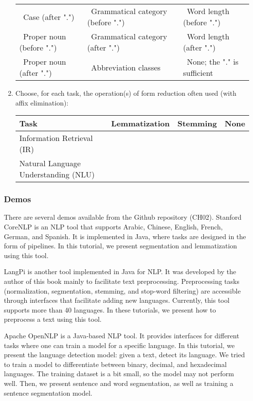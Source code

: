 \documentclass{KBook}
\begin{document}
\begin{enumerate}
	\begin{tabular}{|lll|}
		\hline 
		\Square\ Case (after ".") & \Square\ Grammatical category (before ".") & \Square\ Word length (before ".")\\
		\Square\ Proper noun (before ".") & \Square\ Grammatical category (after ".") & \Square\ Word length (after ".")\\
		\Square\ Proper noun (after ".") & \Square\ Abbreviation classes & \Square\ None; the "." is sufficient\\
		\hline
	\end{tabular}
	
	\item Choose, for each task, the operation(s) of form reduction often used (with affix elimination):
	
	\begin{tabular}{|llll|}
		\hline 
		Task & Lemmatization & Stemming & None\\
		\hline
		Information Retrieval (IR) & \CheckedBox & \Square & \Square \\
		Natural Language Understanding (NLU) & \Square & \CheckedBox & \Square \\
		\hline
	\end{tabular}
	
\end{enumerate}



\subsubsection*{Demos}

There are several demos available from the Github repository (CH02).
Stanford CoreNLP is an NLP tool that supports Arabic, Chinese, English, French, German, and Spanish.
It is implemented in Java, where tasks are designed in the form of pipelines.
In this tutorial, we present segmentation and lemmatization using this tool.

LangPi is another tool implemented in Java for NLP.
It was developed by the author of this book mainly to facilitate text preprocessing.
Preprocessing tasks (normalization, segmentation, stemming, and stop-word filtering) are accessible through interfaces that facilitate adding new languages.
Currently, this tool supports more than 40 languages.
In these tutorials, we present how to preprocess a text using this tool.

Apache OpenNLP is a Java-based NLP tool.
It provides interfaces for different tasks where one can train a model for a specific language.
In this tutorial, we present the language detection model: given a text, detect its language.
We tried to train a model to differentiate between binary, decimal, and hexadecimal languages.
The training dataset is a bit small, so the model may not perform well.
Then, we present sentence and word segmentation, as well as training a sentence segmentation model.
\end{document}
